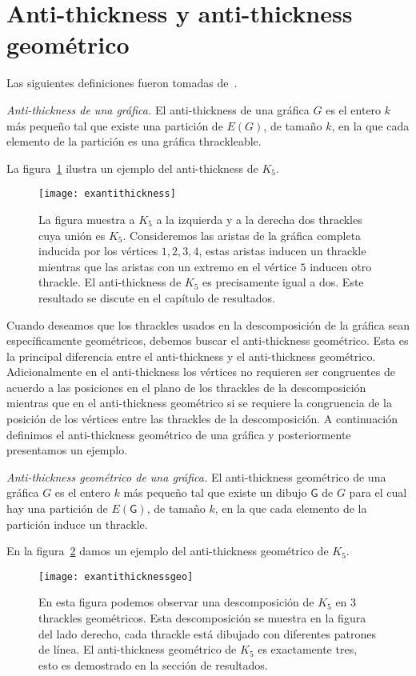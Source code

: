\section{Anti-thickness y anti-thickness geométrico}
Las siguientes definiciones fueron tomadas de~\cite{Dujmovic2017}.
\begin{definition}{\emph{Anti-thickness de una gráfica.}}
  El anti-thickness de una gráfica $G$ es el entero $k$ más pequeño tal que existe una
  partición de $E(G)$, de tamaño $k$, en la que cada elemento de la partición
  es una gráfica thrackleable.
\end{definition}
La figura~\ref{fig:exantithickness} ilustra un ejemplo del anti-thickness de $K_5$.
\begin{figure}[htpb]
  \centering
  \texttt{[image: exantithickness]}
  \caption{La figura muestra a $K_5$ a la izquierda y a la derecha dos thrackles
  cuya unión es $K_5$. Consideremos las aristas de la gráfica completa inducida por los vértices $1,2,3,4$,
  estas aristas inducen un thrackle mientras que las aristas con un extremo en el vértice $5$ inducen otro thrackle.
  El anti-thickness de $K_5$ es precisamente igual a dos. Este resultado se discute en el capítulo de resultados.}
  \label{fig:exantithickness}
\end{figure}

Cuando deseamos que los thrackles usados en la descomposición de la gráfica sean
específicamente geométricos, debemos buscar el anti-thickness geométrico. Esta
es la principal diferencia entre el anti-thickness y el anti-thickness geométrico.
Adicionalmente en el anti-thickness los vértices no requieren ser congruentes
de acuerdo a las posiciones en el plano de los thrackles de la descomposición
mientras que en el anti-thickness geométrico si se requiere la congruencia de la
posición de los vértices entre las thrackles de la descomposición. A continuación
definimos el anti-thickness geométrico de una gráfica y posteriormente presentamos
un ejemplo.

\begin{definition}{\emph{Anti-thickness geométrico de una gráfica.}}
El anti-thickness geométrico de una gráfica $G$ es el entero $k$ más pequeño tal que
existe un dibujo $\mathsf{G}$ de $G$ para el cual hay una partición de $E(\mathsf{G})$,
de tamaño $k$, en la que cada elemento de la partición induce un thrackle.
\end{definition}
En la figura~\ref{fig:exantithicknessgeo} damos un ejemplo del anti-thickness geométrico de $K_5$.
\begin{figure}[htpb]
  \centering
  \texttt{[image: exantithicknessgeo]}
  \caption{En esta figura podemos observar una descomposición de $K_5$ en 3 thrackles
  geométricos. Esta descomposición se muestra en la figura del lado derecho, cada
  thrackle está dibujado con diferentes patrones de línea. El anti-thickness geométrico
  de $K_5$ es exactamente tres, esto es demostrado en la sección de resultados.} %
  \label{fig:exantithicknessgeo}
\end{figure}

